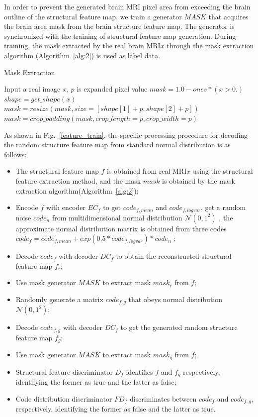 \documentclass[letterpaper]{article} %
\begin{document}
In order to prevent the generated brain MRI pixel area from exceeding the brain outline of the structural feature map, we train a generator $MASK$ that acquires the brain area mask from the brain structure feature map. The generator is synchronized with the  training of structural feature map generation. During training, the mask extracted by the real brain MRI$x$ through the mask extraction algorithm (Algorithm~\ref{alg:2}) is used as label data.
\begin{algorithm}
	\caption{Mask Extraction}
	\label{alg:2}
	\begin{algorithmic}[1]
		\State Input a real image $x$, $p$ is expanded pixel value
		\State $mask = 1.0 - ones * (x > 0.)$
		\State $shape = get\_shape(x)$
		\State $mask = resize(mask, size=[shape[1] + p, shape[2] + p])$
		\State $mask = crop\_padding(mask, crop\_length=p, crop\_width=p)$
	\end{algorithmic}  
\end{algorithm}

As shown in Fig.~\ref{feature_train}, the specific processing procedure for decoding the random structure feature map from standard normal distribution is as follows:
\begin{itemize}
	\item The structural feature map $f$ is obtained from real MRI$x$ using the structural feature extraction method, and the mask $mask$ is obtained by the mask extraction algorithm(Algorithm~\ref{alg:2});
	\item Encode $f$ with encoder $EC_f$ to get $code_{f,mean}$ and $code_{f,logvar}$, get a random noise $code_n$ from multidimensional normal distribution $\mathcal{N}(0,1^2)$ , the approximate normal distribution matrix is obtained from three codes $code_f=code_{f,mean}+exp(0.5*code_{f,logvar})*code_n$ ;
	\item Decode $code_f$ with decoder $DC_f$ to obtain the reconstructed structural feature map $f_r$;
	\item Use mask generator $MASK$ to extract mask $mask_r$ from $f$;
	\item Randomly generate a matrix $code_{f,g}$ that obeys normal distribution $\mathcal{N}(0,1^2)$;
	\item Decode $code_{f,g}$ with decoder $DC_f$ to get the generated random structure feature map $f_g$;
	\item Use mask generator $MASK$ to extract mask $mask_g$ from $f$;
	\item Structural feature discriminator $D_f$ identifies $f$ and $f_g$ respectively, identifying the former as true and the latter as false;
	\item Code distribution discriminator $FD_f$ discriminates between $code_f$ and $code_{f,g}$, respectively, identifying the former as false and the latter as true.
\end{itemize}
\end{document}
